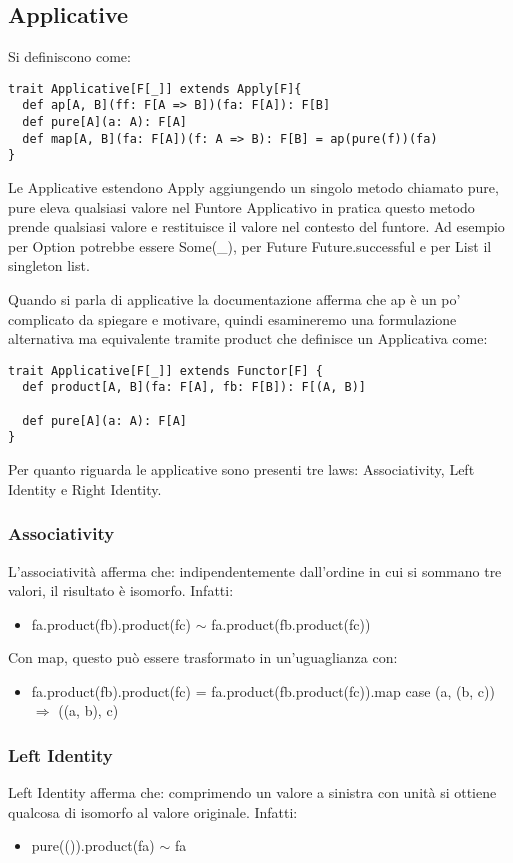 \subsection{Applicative}
Si definiscono come:

\begin{verbatim}
trait Applicative[F[_]] extends Apply[F]{
  def ap[A, B](ff: F[A => B])(fa: F[A]): F[B]
  def pure[A](a: A): F[A]
  def map[A, B](fa: F[A])(f: A => B): F[B] = ap(pure(f))(fa)
}
\end{verbatim}

\noindent Le Applicative estendono Apply aggiungendo un singolo metodo chiamato pure, pure eleva qualsiasi valore nel Funtore Applicativo in pratica questo metodo prende qualsiasi valore e restituisce il valore nel contesto del funtore. Ad esempio per Option potrebbe essere Some(\_), per Future Future.successful e per List il singleton list.

\noindent Quando si parla di applicative la documentazione afferma che ap è un po' complicato da spiegare e motivare, quindi esamineremo una formulazione alternativa ma equivalente tramite product che definisce un Applicativa come:
\begin{verbatim}
trait Applicative[F[_]] extends Functor[F] {
  def product[A, B](fa: F[A], fb: F[B]): F[(A, B)]

  def pure[A](a: A): F[A]
}
\end{verbatim}

\noindent Per quanto riguarda le applicative sono presenti tre laws: Associativity, Left Identity e Right Identity.

\subsubsection{Associativity}
L'associatività afferma che: indipendentemente dall'ordine in cui si sommano tre valori, il risultato è isomorfo.
Infatti:
\begin{itemize}
    \item fa.product(fb).product(fc) $\sim$ fa.product(fb.product(fc))
\end{itemize}
\noindent Con map, questo può essere trasformato in un'uguaglianza con:
\begin{itemize}
    \item fa.product(fb).product(fc) = fa.product(fb.product(fc)).map { case (a, (b, c)) $\Rightarrow$ ((a, b), c) }
\end{itemize}

\subsubsection{Left Identity}
\noindent Left Identity afferma che: comprimendo un valore a sinistra con unità si ottiene qualcosa di isomorfo al valore originale.
Infatti:
\begin{itemize}
    \item pure(()).product(fa) $\sim$ fa
\end{itemize}

